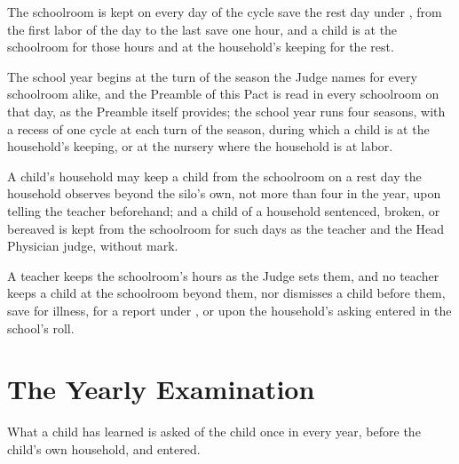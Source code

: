 \begin{clauses}
\item The schoolroom is kept on every day of the cycle save the rest day under , from the first labor of the day to the last save one hour, and a child is at the schoolroom for those hours and at the household's keeping for the rest.
\item The school year begins at the turn of the season the Judge names for every schoolroom alike, and the Preamble of this Pact is read in every schoolroom on that day, as the Preamble itself provides; the school year runs four seasons, with a recess of one cycle at each turn of the season, during which a child is at the household's keeping, or at the nursery where the household is at labor.
\item A child's household may keep a child from the schoolroom on a rest day the household observes beyond the silo's own, not more than four in the year, upon telling the teacher beforehand; and a child of a household sentenced, broken, or bereaved is kept from the schoolroom for such days as the teacher and the Head Physician judge, without mark.
\item A teacher keeps the schoolroom's hours as the Judge sets them, and no teacher keeps a child at the schoolroom beyond them, nor dismisses a child before them, save for illness, for a report under , or upon the household's asking entered in the school's roll.
\end{clauses}

\section{The Yearly Examination}
\label{sec:schooling:yearly-examination}

What a child has learned is asked of the child once in every year, before the child's own household, and entered.

